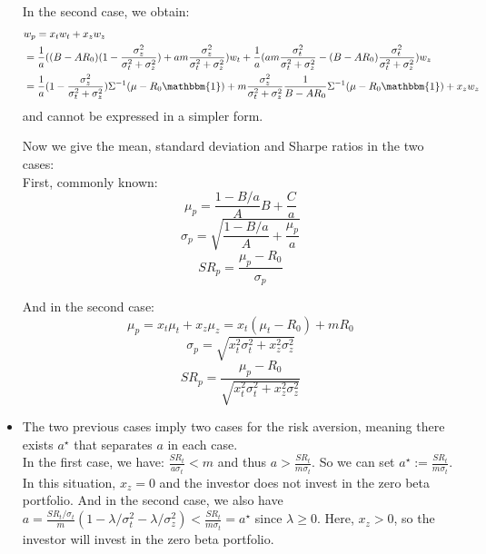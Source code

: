 \documentclass[10pt]{article}
\newenvironment{exercise}[2][Exercise]{\begin{trivlist}
  \item[\hskip \labelsep {\bfseries #1}\hskip \labelsep {\bfseries #2.}]}{\end{trivlist}}
\begin{document}
\begin{exercise}{1}
\begin{itemize}
    In the second case, we obtain: 
  \begin{align*} 
  &w_p = x_tw_t + x_zw_z \\ 
  &= \frac{1}{a}((B-AR_0)(1-\frac{\sigma_z^2}{\sigma_t^2+\sigma_z^2})+ am\frac{\sigma_z^2}{\sigma_t^2+\sigma_z^2})w_t + \frac{1}{a}(am\frac{\sigma_t^2}{\sigma_t^2+\sigma_z^2}-(B-AR_0)\frac{\sigma_t^2}{\sigma_t^2+\sigma_z^2})w_z \\
  &= \frac{1}{a}(1 - \frac{\sigma_z^2}{\sigma_t^2+\sigma_z^2})\Sigma^{-1}(\mu-R_0\mathbbm{1}) + m\frac{\sigma_z^2}{\sigma_t^2+\sigma_z^2}\frac{1}{B-AR_0}\Sigma^{-1}(\mu-R_0\mathbbm{1}) + x_zw_z
  \end{align*} and cannot be expressed in a simpler form. 

  Now we give the mean, standard deviation and Sharpe ratios in the two cases:
  \\
  First, commonly known: 
  $$ \mu_p = \frac{1-B/a}{A}B + \frac{C}{a}$$
  $$ \sigma_p = \sqrt{\frac{1-B/a}{A} + \frac{\mu_p}{a}}$$
  $$ SR_p = \frac{\mu_p-R_0}{\sigma_p} $$
  
  And in the second case:
  $$ \mu_p = x_t\mu_t + x_z\mu_z = x_t(\mu_t -R_0) + mR_0$$
  $$ \sigma_p = \sqrt{x_t^2\sigma_t^2 + x_z^2\sigma_z^2}$$
  $$ SR_p = \frac{\mu_p -R_0 }{\sqrt{x_t^2\sigma_t^2 + x_z^2\sigma_z^2}}$$

\item The two previous cases imply two cases for the risk aversion, meaning there exists $a^\star$ that separates $a$ in each case. 
\\
In the first case, we have: $\frac{SR_t}{a\sigma_t} < m$ and thus $a > \frac{SR_t}{m\sigma_t}$. So we can set $a^\star :=  \frac{SR_t}{m\sigma_t}$. In this situation, $x_z = 0$ and the investor does not invest in the zero beta portfolio. And in the second case, we also have $a = \frac{SR_t/\sigma_t}{m}(1-\lambda/\sigma_t^2-\lambda/\sigma_z^2) < \frac{SR_t}{m\sigma_t} = a^\star$ since $\lambda \geq 0$. Here, $x_z >0$, so the investor will invest in the zero beta portfolio. 


\end{itemize}
\end{exercise}
\end{document}
